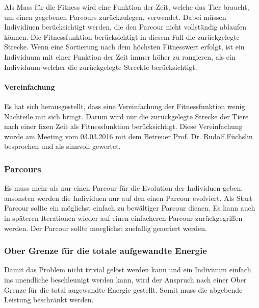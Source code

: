       Als Mass für die Fitness wird eine Funktion der Zeit, welche das Tier braucht,
      um einen gegebenen Parcours zurückzulegen, verwendet.
      Dabei müssen Individiuen berücksichtigt werden,
      die den Parcour nicht vollständig ablaufen können.
      Die Fitnessfunktion berücksichtigt in diesem Fall die zurückgelegte Strecke.
      Wenn eine Sortierung nach dem höchsten Fitnesswert erfolgt,
      ist ein Individuum mit einer Funktion der Zeit immer höher zu rangieren,
      als ein Individuum welcher die zurückgelegte Streckte berücksichtigt.

      \paragraph{Vereinfachung}

        Es hat sich herausgestellt, dass eine Vereinfachung der Fitnessfunktion wenig Nachteile mit sich bringt.
        Darum wird nur die zurückgelegte Strecke der Tiere nach einer fixen Zeit als Fitnessfunktion berücksichtigt.
        Diese Vereinfachung wurde am Meeting vom 03.03.2016 mit dem Betreuer Prof. Dr. Rudolf Füchslin besprochen und als sinnvoll gewertet.

    \subsubsection{Parcours}

      Es muss mehr als nur einen Parcour für die Evolution der Individuen geben,
      ansonsten werden die Individuen nur auf den einen Parcour evolviert.
      Als Start Parcour sollte ein möglichst einfach zu bewältiger Parcour dienen.
      Es kann auch in späteren Iterationen wieder auf einen einfacheren Parcour zurückgegriffen werden.
      Der Parcour sollte moeglichst zuefallig generiert werden.

    \subsubsection{Ober Grenze für die totale aufgewandte Energie}

      Damit das Problem nicht trivial gelöst werden kann und ein Indiviuum einfach ins unendliche beschleunigt werden kann,
      wird der Anspruch nach einer Ober Grenze für die total augewandte Energie gestellt. Somit muss die abgebende Leistung beschränkt werden.
